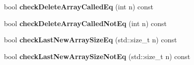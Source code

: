 \begin{DoxyCompactItemize}
bool {\bfseries check\+Delete\+Array\+Called\+Eq} (int n) const
\item 
\mbox{\label{class_mem_counter_a71ed4cdca47735d5aeca17b488ea783a}} 
bool {\bfseries check\+Delete\+Array\+Called\+Not\+Eq} (int n) const
\item 
\mbox{\label{class_mem_counter_a40a5e6f9d0f1fd7d280d1f44abaa6d3f}} 
bool {\bfseries check\+Last\+New\+Array\+Size\+Eq} (std\+::size\+\_\+t n) const
\item 
\mbox{\label{class_mem_counter_acdc6ff6c625a852ab060acdfb8438582}} 
bool {\bfseries check\+Last\+New\+Array\+Size\+Not\+Eq} (std\+::size\+\_\+t n) const
\end{DoxyCompactItemize}
